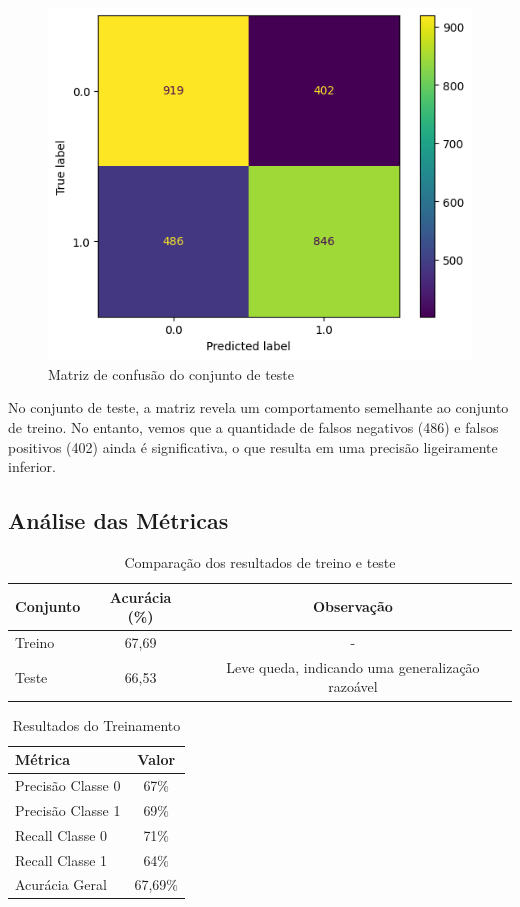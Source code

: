 \documentclass{abntpuc}
\begin{document}
\begin{figure}[H]
    \centering
    \includegraphics[width=\textwidth]{grafico10.png}
    \caption{Matriz de confusão do conjunto de teste}
\end{figure}

No conjunto de teste, a matriz revela um comportamento semelhante ao conjunto de treino. No entanto, vemos que a quantidade de falsos negativos (486) e falsos positivos (402) ainda é significativa, o que resulta em uma precisão ligeiramente inferior.

\subsection*{\centering\large\textbf{Análise das Métricas}}

\begin{table}[H]
\centering
\begin{tabular}{lcc}
\toprule
Conjunto & Acurácia (\%) & Observação \\
\midrule
Treino & 67,69 & - \\
Teste & 66,53 & Leve queda, indicando uma generalização razoável \\
\bottomrule
\end{tabular}
\caption{Comparação dos resultados de treino e teste}
\label{tab:comparacao_resultados}
\end{table}

\begin{table}[H]
\centering
\begin{tabular}{|l|c|}
\hline
Métrica & Valor \\
\hline
Precisão Classe 0 & 67\% \\
Precisão Classe 1 & 69\% \\
Recall Classe 0 & 71\% \\
Recall Classe 1 & 64\% \\
Acurácia Geral & 67,69\% \\
\hline
\end{tabular}
\caption{Resultados do Treinamento}
\label{tab:resultados_treinamento}
\end{table}
\end{document}
